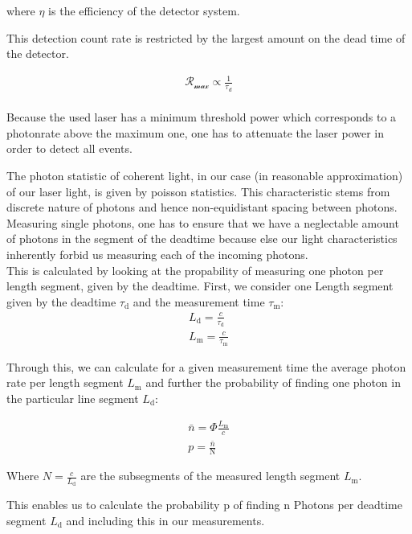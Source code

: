 where \textit{$\eta$} is the efficiency of the detector system.

This detection count rate is restricted by the largest amount on the dead time of the detector.

\begin{align}
    \mathcal{R_{\max}} \propto \frac{1}{\tau_{d}}
\end{align} \\

Because the used laser has a minimum threshold power which corresponds to a photonrate above the maximum one,
one has to attenuate the laser power in order to detect all events.

The photon statistic of coherent light, in our case (in reasonable approximation) of our laser light,
is given by poisson statistics.
This characteristic stems from discrete nature of photons and hence non-equidistant spacing between photons.
Measuring single photons, one has to ensure that we have a neglectable amount of photons in the segment
of the deadtime because else our light characteristics inherently forbid us measuring each of the incoming photons.\\

This is calculated by looking at the propability of measuring one photon per length segment, given by the deadtime.
First, we consider one Length segment given by the deadtime $\tau_{\text{d}}$ and the measurement time $\tau_{\text{m}}$:
\begin{align}
    L_{\text{d}} = \frac{c}{\tau_{\text{d}}}\\
    L_{\text{m}} = \frac{c}{\tau_{\text{m}}}
\end{align}

Through this, we can calculate for a given measurement time the average photon rate per length segment $L_{\text{m}}$
and further the probability of finding one photon in the particular line segment $L_{\text{d}}$:

\begin{align}
    \bar{n} = \Phi \frac{L_{\text{m}}}{c}\\
    p = \frac{\bar{n}}{\text{N}}
\end{align}

Where $N = \frac{c}{L_{\text{d}}}$ are the subsegments of the measured length segment $L_{\text{m}}$.

This enables us to calculate the probability p of finding n Photons per deadtime segment $L_{\text{d}}$ and
including this in our measurements.

